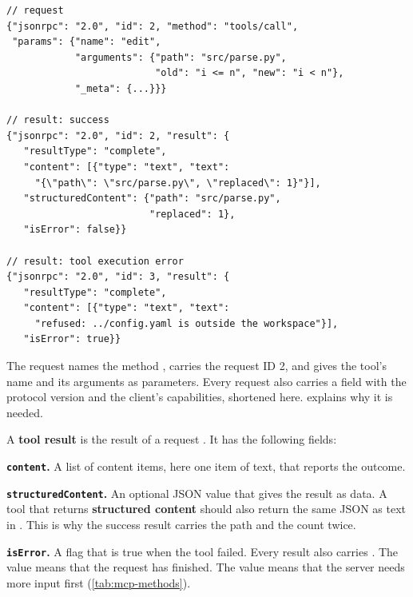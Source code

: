 \noindent\begin{minipage}{\linewidth}
\begin{lstlisting}[basicstyle=\ttfamily\footnotesize, caption={Illustrative \texttt{tools/call} request with its successful result, and a tool execution error returned for a second request (ID 3), which is not shown.}, label=lst:mcp-call]
// request
{"jsonrpc": "2.0", "id": 2, "method": "tools/call",
 "params": {"name": "edit",
            "arguments": {"path": "src/parse.py",
                          "old": "i <= n", "new": "i < n"},
            "_meta": {...}}}

// result: success
{"jsonrpc": "2.0", "id": 2, "result": {
   "resultType": "complete",
   "content": [{"type": "text", "text":
     "{\"path\": \"src/parse.py\", \"replaced\": 1}"}],
   "structuredContent": {"path": "src/parse.py",
                         "replaced": 1},
   "isError": false}}

// result: tool execution error
{"jsonrpc": "2.0", "id": 3, "result": {
   "resultType": "complete",
   "content": [{"type": "text", "text":
     "refused: ../config.yaml is outside the workspace"}],
   "isError": true}}
\end{lstlisting}
\end{minipage}

The request names the method , carries the request ID 2, and gives the tool's
name and its arguments as parameters. Every request also carries a  field with the
protocol version and the client's capabilities, shortened here.  explains why
it is needed.

A \textbf{tool result} is the result of a  request \citep{mcp-spec-2026}. It has
the following fields:
\bi
\item \textbf{\texttt{content}.} A list of content items, here one item of text, that reports the
outcome.
\item \textbf{\texttt{structuredContent}.} An optional JSON value that gives the result as data. A
tool that returns \textbf{structured content} should also return the same JSON as text in
. This is why the success result carries the path and the count twice.
\item \textbf{\texttt{isError}.} A flag that is true when the tool failed.
\ei
Every result also carries . The value  means that the request
has finished. The value  means that the server needs more input first
(\cref{tab:mcp-methods}).

